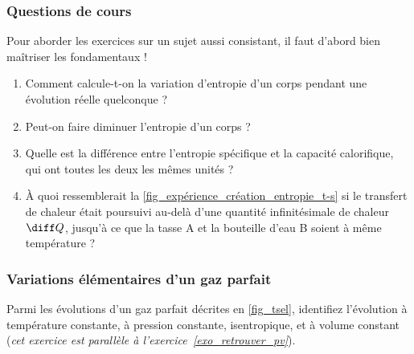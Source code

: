 \begin{boiboiboite}
	\propeau
	\propair
	\isentropiques
	\deltaentropie
\end{boiboiboite}


\subsubsection{Questions de cours}
\label{exo_questions_cours}
	
	Pour aborder les exercices sur un sujet aussi consistant, il faut d’abord bien maîtriser les fondamentaux !

	\begin{enumerate}
		\item Comment calcule-t-on la variation d’entropie d’un corps pendant une évolution réelle quelconque ?
		\item Peut-on faire diminuer l’entropie d’un corps ?
		\item Quelle est la différence entre l’entropie spécifique et la capacité calorifique, qui ont toutes les deux les mêmes unités ?
		\item À quoi ressemblerait la \cref{fig_expérience_création_entropie_t-s} si le transfert de chaleur était poursuivi au-delà d’une quantité infinitésimale de chaleur $\diff Q$, jusqu’à ce que la tasse A et la bouteille d’eau B soient à même température ?
	\end{enumerate}

\subsubsection{Variations élémentaires d’un gaz parfait}
\label{exo_ts_variations_elementaires}

	Parmi les évolutions d’un gaz parfait décrites en \cref{fig_tsel}, identifiez l’évolution à température constante, à pression constante, isentropique, et à volume constant (\textit{cet exercice est parallèle à l’exercice~\ref{exo_retrouver_pv}}).
	
